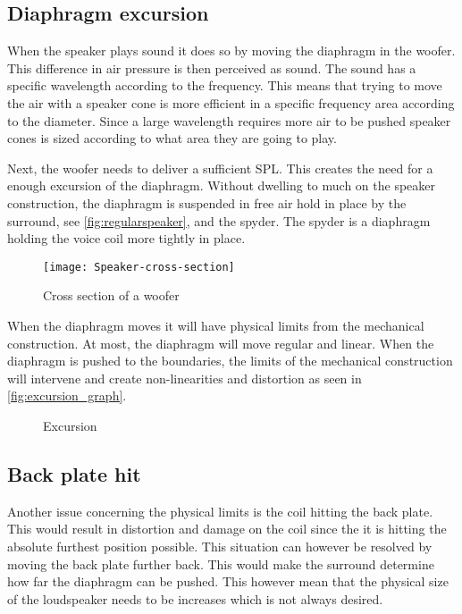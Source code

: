 \subsection*{Diaphragm excursion}
When the speaker plays sound it does so by moving the diaphragm in the woofer. This difference in air pressure is then perceived as sound. The sound has a specific wavelength according to the frequency. This means that trying to move the air with a speaker cone is more efficient in a specific frequency area according to the diameter. %
Since a large wavelength requires more air to be pushed speaker cones is sized according to what area they are going to play.

Next, the woofer needs to deliver a sufficient \gls{SPL}. This creates the need for a enough excursion of the diaphragm. Without dwelling to much on the speaker construction, the diaphragm is suspended in free air hold in place by the surround, see \autoref{fig:regularspeaker}, and the spyder. The spyder is a diaphragm holding the voice coil more tightly in place. 

\begin{figure}[H]
\centering
\texttt{[image: Speaker-cross-section]}
\caption{Cross section of a woofer}
\label{fig:louderspeakerCrossSection}
\end{figure}

When the diaphragm moves it will have physical limits from the mechanical construction. At most, the diaphragm will move regular and linear. When the diaphragm is pushed to the boundaries, the limits of the mechanical construction will intervene and create non-linearities and distortion as seen in \autoref{fig:excursion_graph}. %


\begin{figure}[H]
\centering
{}

\caption{Excursion}
\label{fig:excursion_graph}
\end{figure}





\subsection*{Back plate hit}\label{subsec:impulses}
Another issue concerning the physical limits is the coil hitting the back plate. This would result in distortion and damage on the coil since the it is hitting the absolute furthest position possible. This situation can however be resolved by moving the back plate further back. This would make the surround determine how far the diaphragm can be pushed. This however mean that the physical size of the loudspeaker needs to be increases which is not always desired.

